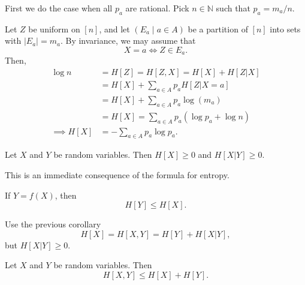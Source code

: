 \documentclass[12pt]{article}
\begin{document}
\begin{proofbox}
	First we do the case when all $p_a$ are rational. Pick $n \in \mathbb{N}$ such that $p_a = m_a/n$.

	Let $Z$ be uniform on $[n]$, and let $(E_a \mid a \in A)$ be a partition of $[n]$ into sets with $|E_a| = m_a$. By invariance, we may assume that 
	\[
	X = a \iff Z \in E_a.
	\]
	Then,
	\begin{align*}
		\log n &= H[Z] = H[Z, X] = H[X] + H[Z|X] \\
		       &= H[X] + \sum_{a \in A} p_a H[Z|X = a] \\
		       &= H[X] + \sum_{a \in A} p_a \log(m_a) \\
		       &= H[X] = \sum_{a \in A} p_a (\log p_a + \log n) \\
		\implies H[X] &= - \sum_{a \in A} p_a \log p_a.
	\end{align*}
\end{proofbox}

\begin{corollary}
	Let $X$ and $Y$ be random variables. Then $H[X] \geq 0$ and $H[X|Y] \geq 0$.
\end{corollary}

This is an immediate consequence of the formula for entropy.

\begin{corollary}
	If $Y = f(X)$, then
	\[
		H[Y] \leq H[X].
	\]
\end{corollary}

\begin{proofbox}
	Use the previous corollary
	\[
		H[X] = H[X, Y] = H[Y] + H[X|Y],
	\]
	but $H[X|Y] \geq 0$.
\end{proofbox}

\begin{proposition}[Subadditivity]
	Let $X$ and $Y$ be random variables. Then
	\[
		H[X,Y] \leq H[X] + H[Y].
	\]
\end{proposition}
\end{document}

